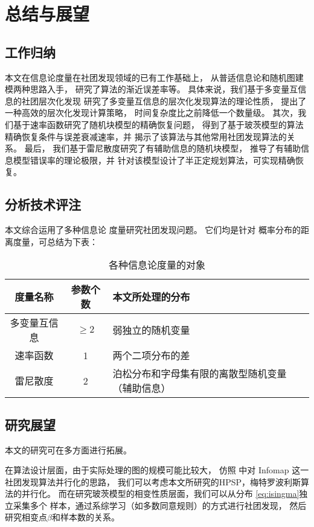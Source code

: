 \chapter{总结与展望}\label{chp:summary}
\section{工作归纳}
本文在信息论度量在社团发现领域的已有工作基础上，
从普适信息论和随机图建模两种思路入手，
研究了算法的渐近误差率等。
具体来说，我们基于多变量互信息的社团层次化发现
研究了多变量互信息的层次化发现算法的理论性质，
提出了一种高效的层次化发现计算策略，
时间复杂度比之前降低一个数量级。
其次，我们基于速率函数研究了随机块模型的精确恢复问题，
得到了基于玻茨模型的算法精确恢复条件与误差衰减速率，并
揭示了该算法与其他常用社团发现算法的关系。
最后， 我们基于雷尼散度研究了有辅助信息的随机块模型，
推导了有辅助信息模型错误率的理论极限，并
针对该模型设计了半正定规划算法，可实现精确恢复。


\section{分析技术评注}
本文综合运用了多种信息论
度量研究社团发现问题。
它们均是针对
概率分布的距离度量，可总结为下表：
\begin{table}[!ht]
    \centering
  \begin{tabular}{ccp{5cm}}
    \hline
     度量名称    &   参数个数 &   本文所处理的分布 \\
    \hline
     多变量互信息 &    $\geq 2$ &    弱独立的随机变量  \\
     速率函数     &    1 &     两个二项分布的差  \\
     雷尼散度     &    2 &    泊松分布和字母集有限的离散型随机变量（辅助信息） \\
    \hline
  \end{tabular}
  \caption{各种信息论度量的对象}\label{tab:info_metric}
\end{table}
  
\section{研究展望}
本文的研究可在多方面进行拓展。

在算法设计层面，由于实际处理的图的规模可能比较大，
仿照 \citet{faysal2021parallel} 中对 Infomap 这一社团发现算法并行化的思路，
我们可以考虑本文所研究的HPSP，梅特罗波利斯算法的并行化。
而在研究玻茨模型的相变性质层面，我们可以从分布
\eqref{eq:isingma}独立采集多个
样本，通过系综学习（如多数同意规则）的方式进行社团发现，
然后研究相变点$\beta$和样本数的关系。

